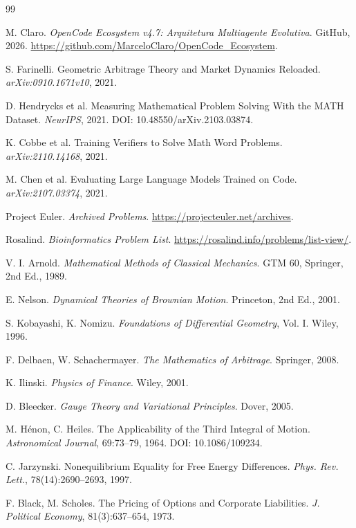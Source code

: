 \documentclass[12pt,a4paper,oneside]{article}
\begin{document}
\begin{thebibliography}{99}

M. Claro. \textit{OpenCode Ecosystem v4.7: Arquitetura Multiagente Evolutiva}.
GitHub, 2026. \url{https://github.com/MarceloClaro/OpenCode\_Ecosystem}.

S. Farinelli. Geometric Arbitrage Theory and Market Dynamics Reloaded.
\textit{arXiv:0910.1671v10}, 2021.

D. Hendrycks et al. Measuring Mathematical Problem Solving With the MATH
Dataset. \textit{NeurIPS}, 2021. DOI: 10.48550/arXiv.2103.03874.

K. Cobbe et al. Training Verifiers to Solve Math Word Problems.
\textit{arXiv:2110.14168}, 2021.

M. Chen et al. Evaluating Large Language Models Trained on Code.
\textit{arXiv:2107.03374}, 2021.

Project Euler. \textit{Archived Problems}. \url{https://projecteuler.net/archives}.

Rosalind. \textit{Bioinformatics Problem List}.
\url{https://rosalind.info/problems/list-view/}.

V. I. Arnold. \textit{Mathematical Methods of Classical Mechanics}.
GTM 60, Springer, 2nd Ed., 1989.

E. Nelson. \textit{Dynamical Theories of Brownian Motion}.
Princeton, 2nd Ed., 2001.

S. Kobayashi, K. Nomizu. \textit{Foundations of Differential Geometry},
Vol. I. Wiley, 1996.

F. Delbaen, W. Schachermayer. \textit{The Mathematics of Arbitrage}.
Springer, 2008.

K. Ilinski. \textit{Physics of Finance}. Wiley, 2001.

D. Bleecker. \textit{Gauge Theory and Variational Principles}.
Dover, 2005.

M. Hénon, C. Heiles. The Applicability of the Third Integral of Motion.
\textit{Astronomical Journal}, 69:73--79, 1964. DOI: 10.1086/109234.

C. Jarzynski. Nonequilibrium Equality for Free Energy Differences.
\textit{Phys. Rev. Lett.}, 78(14):2690--2693, 1997.

F. Black, M. Scholes. The Pricing of Options and Corporate Liabilities.
\textit{J. Political Economy}, 81(3):637--654, 1973.

\end{thebibliography}
\end{document}

